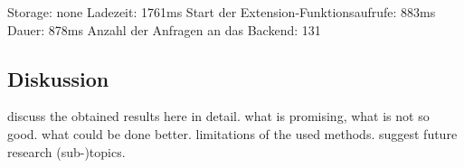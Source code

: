 Storage: none
Ladezeit: 1761ms
Start der Extension-Funktionsaufrufe: 883ms
Dauer: 878ms
Anzahl der Anfragen an das Backend: 131




\subsection{Diskussion}
\label{ss:discussion_details2}

discuss the obtained results here in detail. what is promising, what is not so good. what could be done better. limitations of the used methods. suggest future research (sub-)topics.










